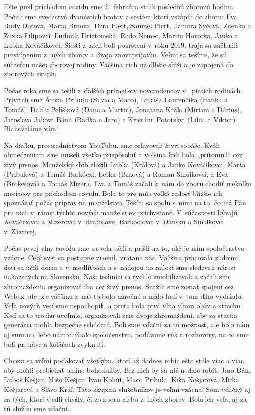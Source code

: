 Ešte pred príchodom covidu sme 2.~februára stihli poslednú zborovú hodinu. Počuli sme svedectvá dvanástich bratov a sestier, ktorí vstúpili do zboru: Eva Rudy Dorová, Marta Brnová, Dara Plett, Samuel Plett, Tamara Syčová, Zdenko a Zuzka Filipovci, Ľudmila Drietomská, Rado Nemec, Martin Hovorka, Janko a Ľubka Kováčikovci. Šiesti z~nich boli pokrstení v~roku 2019, traja sa začlenili prestúpením z~iných zborov a dvaja znovuprijatím. Veľmi sa tešíme, že sú súčasťou našej zborovej rodiny. Väčšina nich už dlhšie slúži a je zapojená do zborových skupín.

Počas roka sme sa tešili z~ďalších prírastkov novorodencov v~ piatich rodinách. Privítali sme Árona Pribulu (Silvia a Maco), Lukáša Laurenčíka (Hanka a Tomáš), Dalilu Pelíškovú (Dana a Martin), Jonatána Kráľa (Miriam a Dárius), Jaroslava Jakova Bána (Radka a Jaro) a Kristánu Pototskyi (Liliia a Viktor). Blahoželáme vám!

Na diaľku, prostredníctvom  YouTubu, sme oslavovali štyri sobáše. Kvôli obmedzeniam sme museli všetko prispôsobiť a väčšina ľudí bola „prítomná“ cez živý prenos. Manželský sľub zložili Ľubka (Kráľová) a Janko Kováčikovci, Marta (Pribulová) a Tomáš Barkóczi, Betka (Brnová) a Roman Smolkovci, a Eva (Brokešová) a Tomáš Mizera. Eva a Tomáš začali k~nám do zboru chodiť niekoľko mesiacov pre príchodom covidu. Bola to pre mňa veľká radosť bližšie ich spoznávať počas príprav na manželstvo. Teším sa spolu s~nimi na to, čo má Pán pre nich v~rámci týchto nových manželstiev prichystané. V~súčasnosti bývajú Kováčikovci a Mizerovci v~Bratislave, Barkóciovci v~Dánsku a Smolkovci v~Zázrivej.

Počas prvej vlny covidu sme sa veľa učili a prišli na to, aké je nám spoločenstvo vzácne. Celý svet sa postupne zmenil, vrátane nás. Väčšina pracovala z~domu, deti sa učili doma a v~modlitbách a s~nádejou na milosť sme sledovali nárast nakazených na Slovensku. Naši technici sa rýchlo zmobilizovali a začali sme zhromaždenia organizovať iba cez živý prenos. Snažili sme zostať spojení cez Webex, ale pre väčšinu z~nás to bolo náročné a málo ľudí v~tom dlho vydržalo.  Veľa nových vecí sme nepochopili, a preto bola prvá vlna vlnou obáv a strachu. Keď sa to trochu uvoľnilo, organizovali sme dvoje zhromaždení, aby sa staršia generácia mohla bezpečne schádzať. Boli sme vďační za tú možnosť, ale bolo nám aj smutno, lebo nám chýbalo spoločenstvo, podávanie rúk a rozhovory, na čo sme boli pri káve a koláčoch zvyknutí.

Chcem sa veľmi poďakovať všetkým, ktorí až dodnes robia ešte stále viac a viac, aby mohli prebiehať  online bohoslužby. Bez nich by sa nič nedalo robiť: Jaro Bán, Ľuboš Kešjar, Mišo Kešjar, Ivan Kohút, Maco Pribula, Kika Kešjarová, Mirka Kešjarová a Slávo Kráľ. Táto skupina služobníkov je veľmi vzácna. Som vďačný aj za tých, ktorí viedli chvály, či zo zboru alebo z~iných zborov. Bolo ich veľa, aj za tú službu sme vďační.

